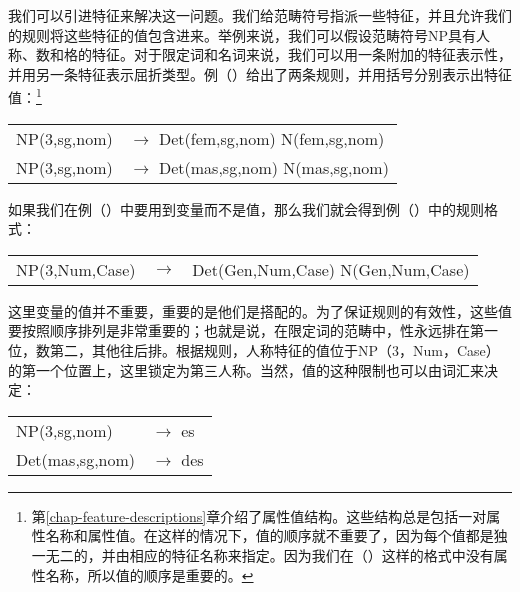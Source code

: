我们可以引进特征来解决这一问题。我们给范畴符号指派一些特征，并且允许我们的规则将这些特征的值包含进来。举例来说，我们可以假设范畴符号NP具有人称、数和格的特征。对于限定词和名词来说，我们可以用一条附加的特征表示性，并用另一条特征表示屈折类型。例（）给出了两条规则，并用括号分别表示出特征值：\footnote{%
第\ref{chap-feature-descriptions}章介绍了属性值结构。这些结构总是包括一对属性名称和属性值。在这样的情况下，值的顺序就不重要了，因为每个值都是独一无二的，并由相应的特征名称来指定。因为我们在（）这样的格式中没有属性名称，所以值的顺序是重要的。
}

\ea
\begin{tabular}[t]{@{}l@{ }l}
NP(3,sg,nom)  & $\to$ Det(fem,sg,nom) N(fem,sg,nom)\\
NP(3,sg,nom)  & $\to$ Det(mas,sg,nom) N(mas,sg,nom)\\
\end{tabular}
\z
如果我们在例（）中要用到变量而不是值，那么我们就会得到例（）中的规则格式：
\ea
\label{Regel-mit-Variablen}
\begin{tabular}[t]{@{}l@{ }l@{ }l}
NP({3},{Num},{Case}) & $\to$ & Det(Gen,{Num},{Case}) N(Gen,{Num},{Case})\\
\end{tabular}
\z
这里变量的值并不重要，重要的是他们是搭配的。为了保证规则的有效性，这些值要按照顺序排列是非常重要的；也就是说，在限定词的范畴中，性永远排在第一位，数第二，其他往后排。根据规则，人称特征的值位于NP（3，Num，Case）的第一个位置上，这里锁定为第三人称。当然，值的这种限制也可以由词汇来决定：
\ea
\begin{tabular}[t]{@{}l@{ }l}
NP(3,sg,nom)  & $\to$ es\\
Det(mas,sg,nom)  & $\to$ des\\
\end{tabular}
\z

